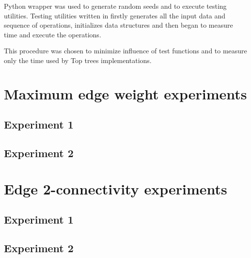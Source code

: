 Python wrapper was used to generate random seeds and to execute testing utilities.
Testing utilities written in \Cpp{} firstly generates all the input data and
sequence of operations, initializes data structures and then began to measure
time and execute the operations.

This procedure was chosen to minimize influence of test functions and to measure
only the time used by Top trees implementations.

\section{Maximum edge weight experiments}

\subsection{Experiment 1}

\subsection{Experiment 2}

\section{Edge 2-connectivity experiments}

\subsection{Experiment 1}

\subsection{Experiment 2}
